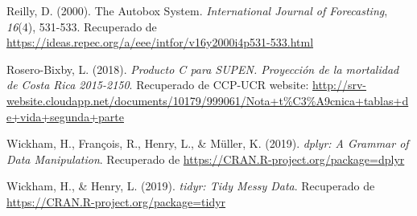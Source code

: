 \documentclass[]{article}
\begin{document}
\leavevmode\hypertarget{ref-autobox}{}%
Reilly, D. (2000). The Autobox System. \emph{International Journal of
Forecasting}, \emph{16}(4), 531-533. Recuperado de
\url{https://ideas.repec.org/a/eee/intfor/v16y2000i4p531-533.html}

\leavevmode\hypertarget{ref-supenprodc}{}%
Rosero-Bixby, L. (2018). \emph{Producto C para SUPEN. Proyección de la
mortalidad de Costa Rica 2015-2150}. Recuperado de CCP-UCR website:
\url{http://srv-website.cloudapp.net/documents/10179/999061/Nota+t\%C3\%A9cnica+tablas+de+vida+segunda+parte}

\leavevmode\hypertarget{ref-dplyr}{}%
Wickham, H., François, R., Henry, L., \& Müller, K. (2019). \emph{dplyr:
A Grammar of Data Manipulation}. Recuperado de
\url{https://CRAN.R-project.org/package=dplyr}

\leavevmode\hypertarget{ref-tidyr}{}%
Wickham, H., \& Henry, L. (2019). \emph{tidyr: Tidy Messy Data}.
Recuperado de \url{https://CRAN.R-project.org/package=tidyr}
\end{document}
